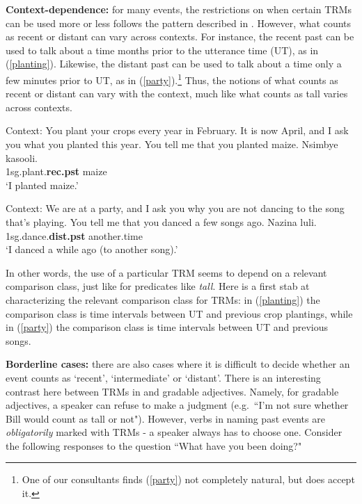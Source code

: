 \documentclass[output=paper,
modfonts
]{langscibook}
\begin{document}
{\bf Context-dependence:} for many events, the restrictions on when certain TRMs can be used more or less follows the pattern described in \citet{ashton54luganda}. However, what counts as recent or distant can vary across contexts. For instance, the recent past can be used to talk about a time months prior to the utterance time (UT), as in (\ref{planting}). Likewise, the distant past can be used to talk about a time only a few minutes prior to UT, as in (\ref{party}).\footnote{One of our consultants finds (\ref{party}) not completely natural, but does accept it.} Thus, the notions of what counts as recent or distant can vary with the context, much like what counts as tall varies across contexts.


\ea\label{planting}
\ea
 Context: You plant your crops every year in February. It is now April, and I ask you what you planted this year. You tell me that you planted maize.
\ex \gll Nsimbye kasooli. \\
{\sc1sg}.plant{\sc.\textbf{rec.pst}} maize \\
\glt `I planted maize.'
\z
\z

\ea\label{party}
\ea Context: We are at a party, and I ask you why you are not dancing to the song that's playing. You tell me that you danced a few songs ago.
\ex \gll Nazina luli. \\
{\sc 1sg}.dance{\sc.\textbf{dist.pst}} another.time \\
\glt `I danced a while ago (to another song).'
\z
\z

In other words, the use of a particular TRM seems to depend on a relevant comparison class, just like for predicates like {\it tall}. Here is a first stab at characterizing the relevant comparison class for TRMs: in (\ref{planting}) the comparison class is time intervals between UT and previous crop plantings, while in (\ref{party}) the comparison class is time intervals between UT and previous songs.




{\bf Borderline cases:} there are also cases where it is difficult to decide whether an event counts as `recent', `intermediate' or `distant'. There is an interesting contrast here between TRMs in  and gradable adjectives. Namely, for gradable adjectives, a speaker can refuse to make a judgment (e.g.~``I'm not sure whether Bill would count as tall or not"). However, verbs in  naming past events are {\it obligatorily} marked with TRMs - a speaker always has to choose one. Consider the following responses to the question ``What have you been doing?"
\end{document}
